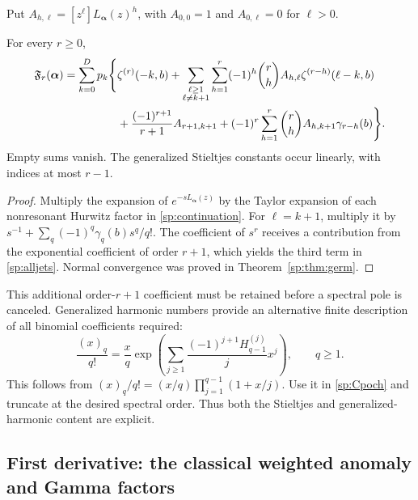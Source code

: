 Put $A_{h,\ell}=[z^\ell]L_{\boldsymbol\alpha}(z)^h$, with
$A_{0,0}=1$ and $A_{0,\ell}=0$ for $\ell>0$.

\begin{corollary}\label{sp:cor:alljets}
For every $r\ge0$,
\begin{align}\label{sp:alljets}
 \mathfrak F_r(\boldsymbol\alpha)
 =\sum_{k=0}^Dp_k\Bigg\{&\zeta^{(r)}(-k,b)
 +\sum_{\substack{\ell\ge1\\\ell\ne k+1}}\sum_{h=1}^r
   (-1)^h\binom rh A_{h,\ell}\zeta^{(r-h)}(\ell-k,b)\notag\\
 &+\frac{(-1)^{r+1}}{r+1}A_{r+1,k+1}
   +(-1)^r\sum_{h=1}^r\binom rh A_{h,k+1}\gamma_{r-h}(b)
                                      \Bigg\}.
\end{align}
Empty sums vanish. The generalized Stieltjes constants occur linearly,
with indices at most $r-1$.
\end{corollary}
\begin{proof}
Multiply the expansion of $e^{-sL_{\boldsymbol\alpha}(z)}$ by the
Taylor expansion of each nonresonant Hurwitz factor in
\eqref{sp:continuation}. For $\ell=k+1$, multiply it by
$s^{-1}+\sum_q(-1)^q\gamma_q(b)s^q/q!$. The coefficient of $s^r$
receives a contribution from the exponential coefficient of order
$r+1$, which yields the third term in \eqref{sp:alljets}. Normal
convergence was proved in Theorem~\ref{sp:thm:germ}.
\end{proof}

This additional order-$r+1$ coefficient must be retained before a
spectral pole is canceled. Generalized harmonic numbers provide an
alternative finite description of all binomial coefficients required:
\begin{equation}\label{sp:harmonic}
 \frac{(x)_q}{q!}
 =\frac xq\exp\left(\sum_{j\ge1}
                   \frac{(-1)^{j+1}H_{q-1}^{(j)}}j x^j\right),
 \qquad q\ge1.
\end{equation}
This follows from $(x)_q/q!=(x/q)\prod_{j=1}^{q-1}(1+x/j)$.
Use it in \eqref{sp:Cpoch} and truncate at the desired spectral order.
Thus both the Stieltjes and generalized-harmonic content are explicit.

\subsection{First derivative: the classical weighted anomaly and Gamma factors}

